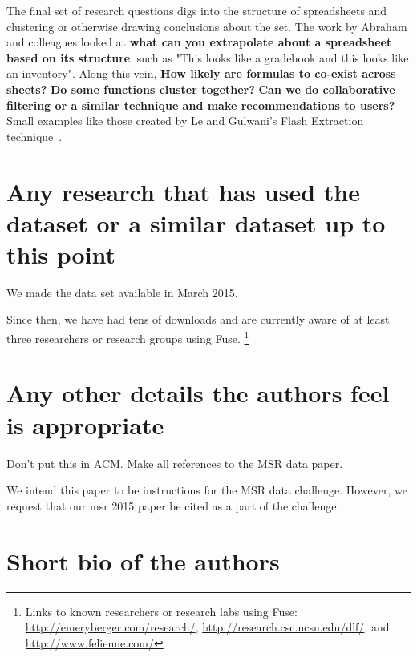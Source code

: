 \documentclass[conference]{IEEEtran}
\begin{document}
The final set of research questions digs into the structure of spreadsheets and clustering or otherwise drawing conclusions about the set.
The work by Abraham and colleagues \cite{Abraham2006} looked at \textbf{what can you extrapolate about a spreadsheet based on its structure}, such as "This looks like a gradebook and this looks like an inventory".
Along this vein, \textbf{How likely are formulas to co-exist across sheets?} 
\textbf{Do some functions cluster together? }
\textbf{Can we do collaborative filtering or a similar technique and make recommendations to users? }
Small examples like those created by Le and Gulwani's Flash Extraction technique~\cite{le2014}.  


\section{Any research that has used the dataset or a similar dataset up to this point}
We made the data set available in March 2015.  

Since then, we have had tens of downloads and are currently aware of at least three researchers or research groups using Fuse.  
\footnote{Links to known researchers or research labs using Fuse: \url{http://emeryberger.com/research/}, \url{http://research.csc.ncsu.edu/dlf/}, and \url{http://www.felienne.com/}}



\section{Any other details the authors feel is appropriate}
Don't put this in ACM.  Make all references to the MSR data paper.

We intend this paper to be instructions for the MSR data challenge.  
However, we request that our msr 2015 paper be cited as a part of the challenge
\section{Short bio of the authors}




\end{document}
